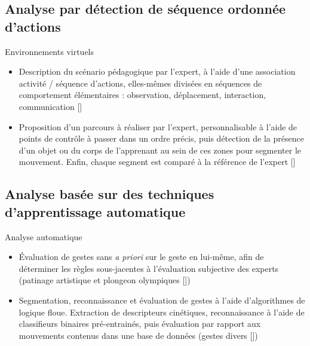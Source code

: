 \documentclass[svgnames]{beamer}
\newcommand{\mycite}[1]{[\textit{\cite{#1}}]}
\begin{document}
	\subsection{Analyse par détection de séquence ordonnée d'actions}
	\begin{frame}{\subsecname}
		\begin{block}{Environnements virtuels}
			\begin{itemize}[label=$\bullet$]
				\item Description du scénario pédagogique par l'expert, à l'aide d'une association activité / séquence d'actions, elles-mêmes divisées en séquences de comportement élémentaires : observation, déplacement, interaction, communication \mycite{Mahdi2019TaE}		
				\item Proposition d'un parcours à réaliser par l'expert, personnalisable à l'aide de points de contrôle à passer dans un ordre précis, puis détection de la présence d'un objet ou du corps de l'apprenant au sein de ces zones pour segmenter le mouvement. Enfin, chaque segment est comparé à la référence de l'expert \mycite{Delest2019MaE}
			\end{itemize}
		\end{block}
	\end{frame}
	
	\subsection{Analyse basée sur des techniques d'apprentissage automatique}
	\begin{frame}{\subsecname}
		\begin{block}{Analyse automatique}
			\begin{itemize}[label=$\bullet$]
				\item Évaluation de gestes sans \textit{a priori} sur le geste en lui-même, afin de déterminer les règles sous-jacentes à l'évaluation subjective des experts (patinage artistique et plongeon olympiques \mycite{Pirsiavash2014AQA})
				\item Segmentation, reconnaissance et évaluation de gestes à l'aide d'algorithmes de logique floue. Extraction de descripteurs cinétiques, reconnaissance à l'aide de classifieurs binaires pré-entrainés, puis évaluation par rapport aux mouvements contenus dans une base de données (gestes divers \mycite{Patrona2018MaA})
			\end{itemize}
		\end{block}
	\end{frame}
	
\end{document}
